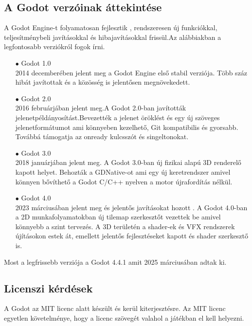 \documentclass[
]{thesis-ekf}
\theoremstyle{definition}
\theoremstyle{remark}
\begin{document}
\subsection{A Godot verzóinak áttekintése}
A Godot Engine-t folyamatosan fejlesztik , rendszeresen új funkciókkal, teljesítménybeli javításokkal és hibajavításokkal frissül.Az alábbiakban a legfontosabb verziókról fogok írni.
\begin{itemize}
	\item[$\bullet$] Godot 1.0 \\ 2014 decemberében jelent meg a Godot Engine első stabil verziója. Több száz hibát javítottak és a közösség is jelentősen megnövekedett.\cite{Godot1.0}
	\item[$\bullet$] Godot 2.0 \\ 2016 februárjában jelent meg.A Godot 2.0-ban javították jelenetpéldányosítást.Bevezették a jelenet öröklést és egy új szöveges jelenetformátumot ami könnyeben kezelhető, Git kompatibilis és gyorsabb. Továbbá támogatja az onready kulcsszót és singeltonokat.\cite{Godot2.0}
	\item[$\bullet$] Godot 3.0 \\ 2018 januárjában jelent meg. A Godot 3.0-ban új fizikai alapú 3D renderelő kapott helyet. Behozták a GDNative-ot  ami egy új keretrendszer amivel könnyen bővíthető a Godot C/C++ nyelven a motor újrafordítás nélkül.\cite{Godot3.0}
	\item [$\bullet$] Godot 4.0\\  2023 márciusában jelent meg és jelentős javításokat hozott .  A Godot 4.0-ban a 2D munkafolyamatokban új tilemap szerkesztőt vezettek be amivel könnyebb a szint tervezés. A 3D területén a shader-ek és VFX rendszerek újításokon estek át, emellett jelentős fejlesztéseket kapott és shader szerkesztő is.\cite{Godot4.0}
\end{itemize}
Most a legfrissebb verziója a Godot 4.4.1 amit 2025 márciusában adtak ki.
\subsection{Licenszi kérdések}
A Godot az MIT licenc alatt készült és kerül kiterjesztésre. Az MIT licenc egyetlen követelménye, hogy a licenc szövegét valahol a játékban el kell helyezni.\cite{GodotLicenc}
\end{document}
